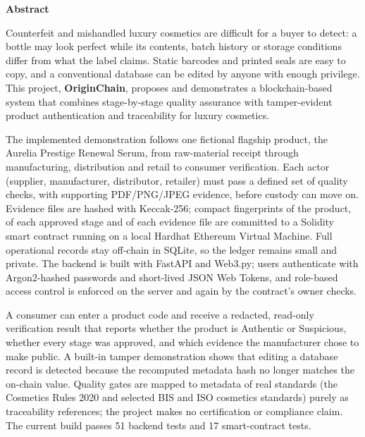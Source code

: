 \documentclass[12pt,a4paper]{report}
\begin{document}
\newpage
\thispagestyle{plain}
\begin{center}
    {\Large \textbf{Abstract}\par}
\end{center}
\vspace{0.25cm}
{\small{}
Counterfeit and mishandled luxury cosmetics are difficult for a buyer to detect: a bottle may look perfect while its contents, batch history or storage conditions differ from what the label claims. Static barcodes and printed seals are easy to copy, and a conventional database can be edited by anyone with enough privilege. This project, \textbf{OriginChain}, proposes and demonstrates a blockchain-based system that combines stage-by-stage quality assurance with tamper-evident product authentication and traceability for luxury cosmetics.

The implemented demonstration follows one fictional flagship product, the Aurelia Prestige Renewal Serum, from raw-material receipt through manufacturing, distribution and retail to consumer verification. Each actor (supplier, manufacturer, distributor, retailer) must pass a defined set of quality checks, with supporting PDF/PNG/JPEG evidence, before custody can move on. Evidence files are hashed with Keccak-256; compact fingerprints of the product, of each approved stage and of each evidence file are committed to a Solidity smart contract running on a local Hardhat Ethereum Virtual Machine. Full operational records stay off-chain in SQLite, so the ledger remains small and private. The backend is built with FastAPI and Web3.py; users authenticate with Argon2-hashed passwords and short-lived JSON Web Tokens, and role-based access control is enforced on the server and again by the contract's owner checks.

A consumer can enter a product code and receive a redacted, read-only verification result that reports whether the product is Authentic or Suspicious, whether every stage was approved, and which evidence the manufacturer chose to make public. A built-in tamper demonstration shows that editing a database record is detected because the recomputed metadata hash no longer matches the on-chain value. Quality gates are mapped to metadata of real standards (the Cosmetics Rules 2020 and selected BIS and ISO cosmetics standards) purely as traceability references; the project makes no certification or compliance claim. The current build passes 51 backend tests and 17 smart-contract tests.

}
\end{document}
